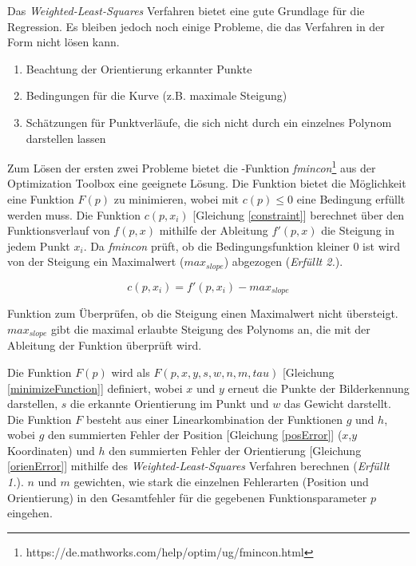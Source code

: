 Das \textit{Weighted-Least-Squares} Verfahren bietet eine gute Grundlage für die Regression. Es bleiben jedoch noch einige Probleme, die das Verfahren in der Form nicht lösen kann.
\begin{enumerate}
\item Beachtung der Orientierung erkannter Punkte
\item Bedingungen für die Kurve (z.B. maximale Steigung)
\item Schätzungen für Punktverläufe, die sich nicht durch ein einzelnes Polynom darstellen lassen
\end{enumerate}

Zum Lösen der ersten zwei Probleme bietet die \matlab -Funktion \textit{fmincon}\footnote{https://de.mathworks.com/help/optim/ug/fmincon.html} aus der Optimization Toolbox eine geeignete Lösung. Die Funktion bietet die Möglichkeit eine Funktion $F(p)$ zu minimieren, wobei mit $c(p) \leq 0$ eine Bedingung erfüllt werden muss. Die Funktion $c(p,x_i)$ [Gleichung \ref{constraint}] berechnet über den Funktionsverlauf von $f(p,x)$ mithilfe der Ableitung $f'(p,x)$ die Steigung in jedem Punkt $x_i$. Da \textit{fmincon} prüft, ob die Bedingungsfunktion kleiner 0 ist wird von der Steigung ein Maximalwert ($max_{slope}$) abgezogen (\textit{Erfüllt 2.}).\\
\begin{ownequation}[H]
\begin{equation}
c(p,x_i) = f'(p,x_i)-max_{slope}
\end{equation}
\caption[Funktion zum Überprüfen ob die Steigung einen Maximalwert nicht übersteigt.]{Funktion zum Überprüfen, ob die Steigung einen Maximalwert nicht übersteigt. $max_{slope}$ gibt die maximal erlaubte Steigung des Polynoms an, die mit der Ableitung der Funktion überprüft wird.}
\label{constraint}
\end{ownequation}
Die Funktion $F(p)$ wird als $F(p,x,y,s,w,n,m,tau)$ [Gleichung \ref{minimizeFunction}] definiert, wobei $x$ und $y$ erneut die Punkte der Bilderkennung darstellen, $s$ die erkannte Orientierung im Punkt und $w$ das Gewicht darstellt. Die Funktion $F$ besteht aus einer Linearkombination der Funktionen $g$ und $h$, wobei $g$ den summierten Fehler der Position [Gleichung \ref{posError}] ($x$,$y$ Koordinaten) und $h$ den summierten Fehler der Orientierung [Gleichung \ref{orienError}] mithilfe des \textit{Weighted-Least-Squares} Verfahren berechnen (\textit{Erfüllt 1.}). $n$ und $m$ gewichten, wie stark die einzelnen Fehlerarten (Position und Orientierung) in den Gesamtfehler für die gegebenen Funktionsparameter $p$ eingehen.\\
